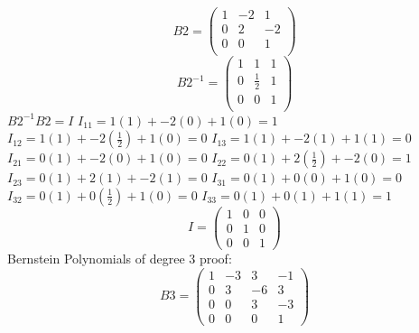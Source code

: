 \documentclass[12pt]{article}
\begin{document}
\[
B2 = 
\begin{pmatrix}
1 & -2 & 1\\
0 & 2 & -2 \\
0 & 0 & 1 \\
\end{pmatrix}
\]
\[
B2^{-1} = 
\begin{pmatrix}
1 & 1 & 1\\
0 & \frac{1}{2} & 1 \\
0 & 0 & 1 \\
\end{pmatrix}
\]
$B2^{-1}B2=I$
\newline $I_{11}=1(1)+-2(0)+1(0)=1$
\newline $I_{12}=1(1)+-2(\frac{1}{2})+1(0)=0$
\newline $I_{13}=1(1)+-2(1)+1(1)=0$
\newline $I_{21}=0(1)+-2(0)+1(0)=0$
\newline $I_{22}=0(1)+2(\frac{1}{2})+-2(0)=1$
\newline $I_{23}=0(1)+2(1)+-2(1)=0$
\newline $I_{31}=0(1)+0(0)+1(0)=0$
\newline $I_{32}=0(1)+0(\frac{1}{2})+1(0)=0$
\newline $I_{33}=0(1)+0(1)+1(1)=1$
\[
I = 
\begin{pmatrix}
1 & 0 & 0\\
0 & 1 & 0 \\
0 & 0 & 1 
\end{pmatrix}
\]
Bernstein Polynomials of degree 3 proof: \\

\[
B3 = 
\begin{pmatrix}
1 & -3  & 3 & -1 \\
0 &  3  & -6 & 3 \\
0 &  0  & 3  & -3 \\
0 &  0  & 0  & 1
\end{pmatrix} 
\]
\end{document}
